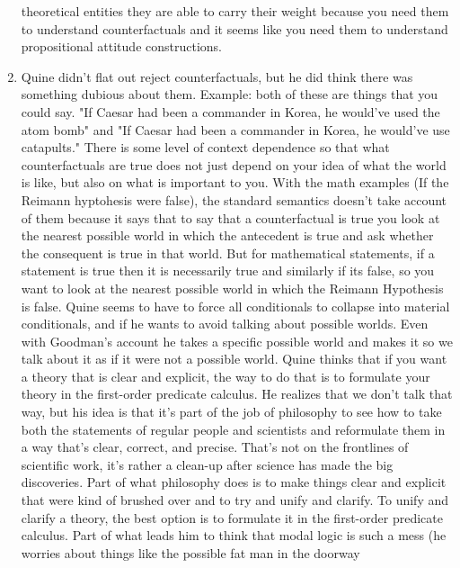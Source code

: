 \documentclass[12pt]{article}
\theoremstyle{definition}
\begin{document}
\begin{enumerate}
        theoretical entities they are able to carry their weight because you
        need them to understand counterfactuals and it seems like you need them
        to understand propositional attitude constructions. 
    \item
        Quine didn't flat out reject counterfactuals, but he did think there
        was something dubious about them. Example: both of these are things
        that you could say. "If Caesar had been a commander in Korea, he
        would've used the atom bomb" and "If Caesar had been a commander in
        Korea, he would've use catapults." There is some level of context
        dependence so that what counterfactuals are true does not just depend
        on your idea of what the world is like, but also on what is important
        to you. With the math examples (If the Reimann hyptohesis were false),
        the standard semantics doesn't take account of them because it says
        that to say that a counterfactual is true you look at the nearest
        possible world in which the antecedent is true and ask whether the
        consequent is true in that world. But for mathematical statements, if a
        statement is true then it is necessarily true and similarly if its
        false, so you want to look at the nearest possible world in which the
        Reimann Hypothesis is false.  Quine seems to have to force all
        conditionals to collapse into material conditionals, and if he wants to
        avoid talking about possible worlds.  Even with Goodman's account he
        takes a specific possible world and makes it so we talk about it as if
        it were not a possible world. Quine  thinks that if you want a theory
        that is clear and explicit, the way to do that is to formulate your
        theory in the first-order predicate calculus. He realizes that we don't
        talk that way, but his idea is that it's part of the job of philosophy
        to see how to take both the statements of regular people and scientists
        and reformulate them in a way that's clear, correct, and precise.
        That's not on the frontlines of scientific work, it's rather a clean-up
        after science has made the big discoveries. Part of what philosophy
        does is to make things clear and explicit that were kind of brushed
        over and to try and unify and clarify. To unify and clarify a theory,
        the best option is to formulate it in the first-order predicate
        calculus. Part of what leads him to think that modal logic is such a
        mess (he worries about things like the possible fat man in the doorway

\end{enumerate}
\end{document}
